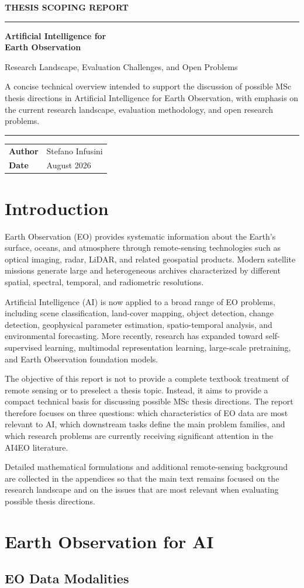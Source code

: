 \documentclass[
    11pt,
    a4paper,
    parskip=half,
    bibliography=totoc,
    numbers=noenddot
]{scrartcl}
\makeatletter
\newcommand{\ReportTitle}{Artificial Intelligence for\\[-0.05em] Earth Observation}
\newcommand{\ReportSubtitle}{Research Landscape, Evaluation Challenges, and Open Problems}
\newcommand{\ReportAuthor}{Stefano Infusini}
\newcommand{\ReportDate}{August 2026}
\newcommand{\makeReportTitle}{%
\begin{titlepage}
    \thispagestyle{empty}
    \vspace*{1.2cm}

    {\sffamily\small\bfseries\color{Accent}\MakeUppercase{Thesis Scoping Report}}\par
    \vspace{0.45cm}
    {\color{Accent}\rule{2.4cm}{2.2pt}}\par

    \vspace{1.35cm}
    {\sffamily\bfseries\fontsize{29}{33}\selectfont\color{Navy}
        \ReportTitle\par}

    \vspace{0.65cm}
    {\sffamily\fontsize{15.5}{20}\selectfont\color{TextMuted}
        \ReportSubtitle\par}

    \vspace{1.1cm}
    \begin{minipage}{0.88\textwidth}
        \small\color{TextMuted}
        A concise technical overview intended to support the discussion of
        possible MSc thesis directions in Artificial Intelligence for Earth
        Observation, with emphasis on the current research landscape,
        evaluation methodology, and open research problems.
    \end{minipage}

    \vfill

    {\color{RuleGray}\rule{\textwidth}{0.7pt}}\par
    \vspace{0.55cm}

    \begin{tabular}{@{}>{\sffamily\bfseries\color{Navy}}p{2.3cm} p{8.8cm}@{}}
        Author & \ReportAuthor \\
        Date   & \ReportDate \\
    \end{tabular}

    \vspace{0.7cm}
\end{titlepage}
}
\makeatother
\begin{document}
\makeReportTitle

\clearpage
\thispagestyle{plain}
\tableofcontents
\clearpage

\section{Introduction}

Earth Observation (EO) provides systematic information about the Earth's
surface, oceans, and atmosphere through remote-sensing technologies such
as optical imaging, radar, LiDAR, and related geospatial products.
Modern satellite missions generate large and heterogeneous archives
characterized by different spatial, spectral, temporal, and radiometric
resolutions.

Artificial Intelligence (AI) is now applied to a broad range of EO
problems, including scene classification, land-cover mapping, object
detection, change detection, geophysical parameter estimation,
spatio-temporal analysis, and environmental forecasting. More recently,
research has expanded toward self-supervised learning, multimodal
representation learning, large-scale pretraining, and Earth Observation
foundation models.

The objective of this report is not to provide a complete textbook
treatment of remote sensing or to preselect a thesis topic. Instead, it
aims to provide a compact technical basis for discussing possible MSc
thesis directions. The report therefore focuses on three questions:
which characteristics of EO data are most relevant to AI, which
downstream tasks define the main problem families, and which research
problems are currently receiving significant attention in the AI4EO
literature.

Detailed mathematical formulations and additional remote-sensing
background are collected in the appendices so that the main text remains
focused on the research landscape and on the issues that are most
relevant when evaluating possible thesis directions.

\section{Earth Observation for AI}

\subsection{EO Data Modalities}
\end{document}
